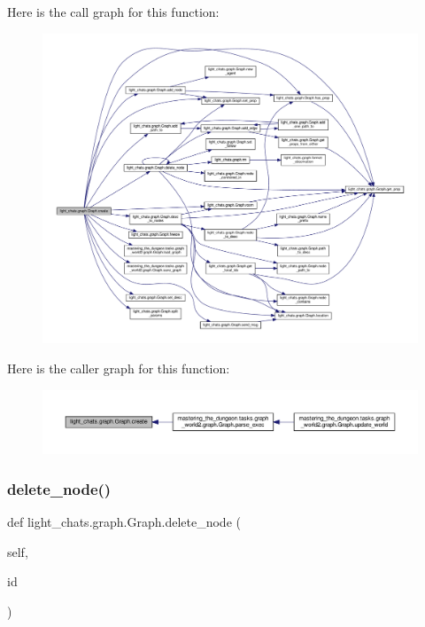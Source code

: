 Here is the call graph for this function\+:
\nopagebreak
\begin{figure}[H]
\begin{center}
\leavevmode
\includegraphics[width=350pt]{classlight__chats_1_1graph_1_1Graph_acc495d94797d39558b1711d0bbf6346d_cgraph}
\end{center}
\end{figure}
Here is the caller graph for this function\+:
\nopagebreak
\begin{figure}[H]
\begin{center}
\leavevmode
\includegraphics[width=350pt]{classlight__chats_1_1graph_1_1Graph_acc495d94797d39558b1711d0bbf6346d_icgraph}
\end{center}
\end{figure}
\mbox{\label{classlight__chats_1_1graph_1_1Graph_a703188eb5340371b8ad793ddebd2af30}} 
\subsubsection{\texorpdfstring{delete\+\_\+node()}{delete\_node()}}
{\footnotesize\ttfamily def light\+\_\+chats.\+graph.\+Graph.\+delete\+\_\+node (\begin{DoxyParamCaption}\item[{}]{self,  }\item[{}]{id }\end{DoxyParamCaption})}

